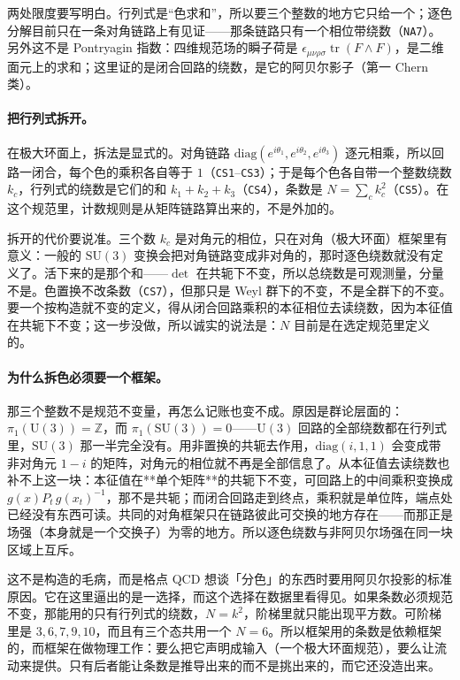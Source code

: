 \documentclass[aps,prd,preprint,superscriptaddress,amsmath,amssymb]{revtex4-2}
\begin{document}
两处限度要写明白。行列式是“色求和”，所以要三个整数的地方它只给一个；逐色分解目前只在一条对角链路上有见证——那条链路只有一个相位带绕数（\texttt{NA7}）。另外这不是 Pontryagin 指数：四维规范场的瞬子荷是 $\epsilon_{\mu\nu\rho\sigma}\operatorname{tr}(F\wedge F)$，是二维面元上的求和；这里证的是闭合回路的绕数，是它的阿贝尔影子（第一 Chern 类）。

\paragraph{把行列式拆开。}
在极大环面上，拆法是显式的。对角链路 $\mathrm{diag}(e^{i\theta_1},e^{i\theta_2},e^{i\theta_3})$ 逐元相乘，所以回路一闭合，每个色的乘积各自等于 $1$（\texttt{CS1}--\texttt{CS3}）；于是每个色各自带一个整数绕数 $k_c$，行列式的绕数是它们的和 $k_1+k_2+k_3$（\texttt{CS4}），条数是 $N=\sum_c k_c^2$（\texttt{CS5}）。在这个规范里，计数规则是从矩阵链路算出来的，不是外加的。

拆开的代价要说准。三个数 $k_c$ 是对角元的相位，只在对角（极大环面）框架里有意义：一般的 $\mathrm{SU}(3)$ 变换会把对角链路变成非对角的，那时逐色绕数就没有定义了。活下来的是那个和——$\det$ 在共轭下不变，所以总绕数是可观测量，分量不是。色置换不改条数（\texttt{CS7}），但那只是 Weyl 群下的不变，不是全群下的不变。要一个按构造就不变的定义，得从闭合回路乘积的本征相位去读绕数，因为本征值在共轭下不变；这一步没做，所以诚实的说法是：$N$ 目前是在选定规范里定义的。

\paragraph{为什么拆色必须要一个框架。}
那三个整数不是规范不变量，再怎么记账也变不成。原因是群论层面的：$\pi_1(\mathrm{U}(3))=\mathbb{Z}$，而 $\pi_1(\mathrm{SU}(3))=0$——$\mathrm{U}(3)$ 回路的全部绕数都在行列式里，$\mathrm{SU}(3)$ 那一半完全没有。用非置换的共轭去作用，$\mathrm{diag}(i,1,1)$ 会变成带非对角元 $1-i$ 的矩阵，对角元的相位就不再是全部信息了。从本征值去读绕数也补不上这一块：本征值在**单个矩阵**的共轭下不变，可回路上的中间乘积变换成 $g(x)P_t\,g(x_t)^{-1}$，那不是共轭；而闭合回路走到终点，乘积就是单位阵，端点处已经没有东西可读。共同的对角框架只在链路彼此可交换的地方存在——而那正是场强（本身就是一个交换子）为零的地方。所以逐色绕数与非阿贝尔场强在同一块区域上互斥。

这不是构造的毛病，而是格点 QCD 想谈「分色」的东西时要用阿贝尔投影的标准原因。它在这里逼出的是一选择，而这个选择在数据里看得见。如果条数必须规范不变，那能用的只有行列式的绕数，$N=k^2$，阶梯里就只能出现平方数。可阶梯里是 $3,6,7,9,10$，而且有三个态共用一个 $N=6$。所以框架用的条数是依赖框架的，而框架在做物理工作：要么把它声明成输入（一个极大环面规范），要么让流动来提供。只有后者能让条数是推导出来的而不是挑出来的，而它还没造出来。
\end{document}
